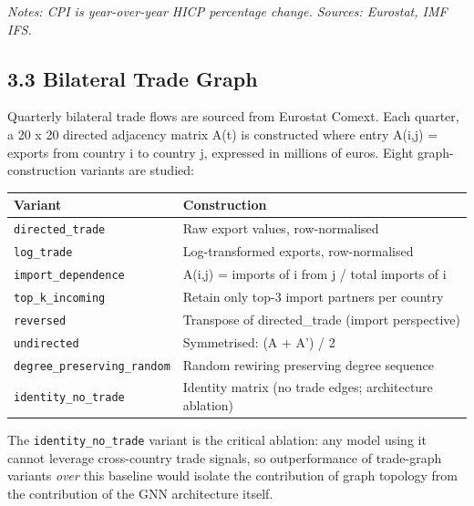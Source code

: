 \documentclass[
]{article}
\newcounter{none} %
\begin{document}
\emph{Notes: CPI is year-over-year HICP percentage change. Sources:
Eurostat, IMF IFS.}

\subsection{3.3 Bilateral Trade Graph}\label{bilateral-trade-graph}

Quarterly bilateral trade flows are sourced from Eurostat Comext. Each
quarter, a 20 x 20 directed adjacency matrix A(t) is constructed where
entry A(i,j) = exports from country i to country j, expressed in
millions of euros. Eight graph-construction variants are studied:

{\def\LTcaptype{none} %
\begin{longtable}[]{@{}
  >{\raggedright\arraybackslash}p{}
  >{\raggedright\arraybackslash}p{}@{}}
\toprule\noalign{}
\begin{minipage}[b]{\linewidth}\raggedright
Variant
\end{minipage} & \begin{minipage}[b]{\linewidth}\raggedright
Construction
\end{minipage} \\
\midrule\noalign{}
\endhead
\bottomrule\noalign{}
\endlastfoot
\texttt{directed\_trade} & Raw export values, row-normalised \\
\texttt{log\_trade} & Log-transformed exports, row-normalised \\
\texttt{import\_dependence} & A(i,j) = imports of i from j / total
imports of i \\
\texttt{top\_k\_incoming} & Retain only top-3 import partners per
country \\
\texttt{reversed} & Transpose of directed\_trade (import perspective) \\
\texttt{undirected} & Symmetrised: (A + A') / 2 \\
\texttt{degree\_preserving\_random} & Random rewiring preserving degree
sequence \\
\texttt{identity\_no\_trade} & Identity matrix (no trade edges;
architecture ablation) \\
\end{longtable}
}

The \texttt{identity\_no\_trade} variant is the critical ablation: any
model using it cannot leverage cross-country trade signals, so
outperformance of trade-graph variants \emph{over} this baseline would
isolate the contribution of graph topology from the contribution of the
GNN architecture itself.
\end{document}
